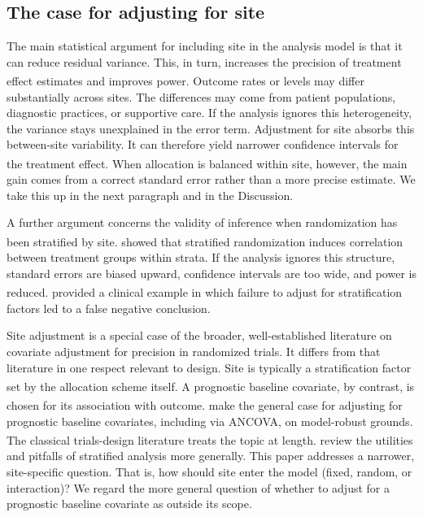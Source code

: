 \documentclass[
  11pt,
]{article}
\begin{document}
\subsection{The case for adjusting for site}\label{the-case-for-adjusting-for-site}

The main statistical argument for including site in the analysis
model is that it can reduce residual variance. This, in turn,
increases the precision of treatment effect estimates and improves
power\textsuperscript{}. Outcome rates or levels may differ
substantially across sites. The differences may come from patient
populations, diagnostic practices, or supportive care. If the
analysis ignores this heterogeneity, the variance stays
unexplained in the error term. Adjustment for site absorbs this
between-site variability. It can therefore yield narrower
confidence intervals for the treatment effect\textsuperscript{}. When allocation is balanced within site,
however, the main gain comes from a correct standard error rather
than a more precise estimate. We take this up in the next paragraph
and in the Discussion.

A further argument concerns the validity of inference when
randomization has been stratified by site.\textsuperscript{} showed that stratified
randomization induces correlation between treatment groups within
strata. If the analysis ignores this structure, standard errors
are biased upward, confidence intervals are too wide, and power
is reduced.\textsuperscript{} provided
a clinical example in which failure to adjust for stratification
factors led to a false negative conclusion.

Site adjustment is a special case of the broader, well-established
literature on covariate adjustment for precision in randomized
trials. It differs from that literature in one respect relevant
to design. Site is typically a stratification factor set by the
allocation scheme itself\textsuperscript{}. A prognostic
baseline covariate, by contrast, is chosen for its association
with outcome.\textsuperscript{} make the
general case for adjusting for prognostic baseline covariates,
including via ANCOVA, on model-robust grounds. The classical
trials-design literature treats the topic at length\textsuperscript{}.\textsuperscript{} review
the utilities and pitfalls of stratified analysis more generally.
This paper addresses a narrower, site-specific question. That is,
how should site enter the model (fixed, random, or interaction)?
We regard the more general question of whether to adjust for a
prognostic baseline covariate as outside its scope.
\end{document}
